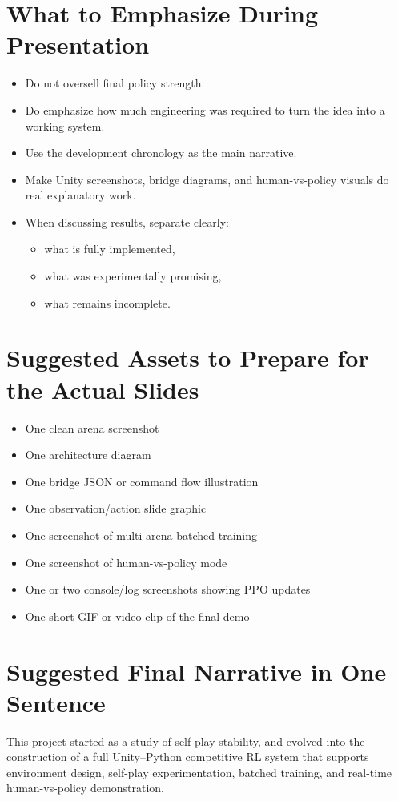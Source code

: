 \documentclass[11pt]{article}
\begin{document}
\section{What to Emphasize During Presentation}

\begin{itemize}
    \item Do not oversell final policy strength.
    \item Do emphasize how much engineering was required to turn the idea into a working system.
    \item Use the development chronology as the main narrative.
    \item Make Unity screenshots, bridge diagrams, and human-vs-policy visuals do real explanatory work.
    \item When discussing results, separate clearly:
    \begin{itemize}
        \item what is fully implemented,
        \item what was experimentally promising,
        \item what remains incomplete.
    \end{itemize}
\end{itemize}

\section{Suggested Assets to Prepare for the Actual Slides}

\begin{itemize}
    \item One clean arena screenshot
    \item One architecture diagram
    \item One bridge JSON or command flow illustration
    \item One observation/action slide graphic
    \item One screenshot of multi-arena batched training
    \item One screenshot of human-vs-policy mode
    \item One or two console/log screenshots showing PPO updates
    \item One short GIF or video clip of the final demo
\end{itemize}

\section{Suggested Final Narrative in One Sentence}

This project started as a study of self-play stability, and evolved into the construction of a full Unity--Python competitive RL system that supports environment design, self-play experimentation, batched training, and real-time human-vs-policy demonstration.
\end{document}
